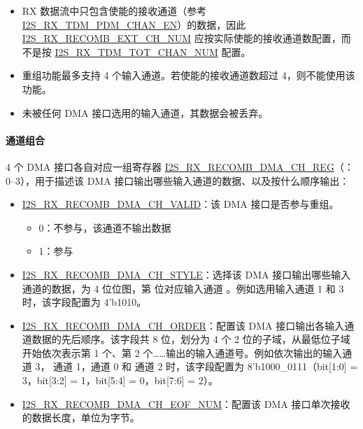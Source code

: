 \documentclass[main\_\_CN.tex]{subfiles}
\begin{document}
\begin{tiplisting}
\vspace{-2em}
\begin{itemize}
    \item RX 数据流中只包含使能的接收通道（参考 \hyperref[fielddesc:I2SRXTDMPDMCHAN0EN]{I2S\_RX\_TDM\_PDM\_CHAN\_EN}）的数据，因此\\ \hyperref[fielddesc:I2SRXRECOMBEXTCHNUM]{I2S\_RX\_RECOMB\_EXT\_CH\_NUM} 应按实际使能的接收通道数配置，而不是按 \hyperref[fielddesc:I2SRXTDMTOTCHANNUM]{I2S\_RX\_TDM\_TOT\_CHAN\_NUM} 配置。
    \item 重组功能最多支持 4 个输入通道。若使能的接收通道数超过 4，则不能使用该功能。
    \item 未被任何 DMA 接口选用的输入通道，其数据会被丢弃。
\end{itemize}
\end{tiplisting}

\paragraph{通道组合}

4 个 DMA 接口各自对应一组寄存器 \hyperref[regdesc:I2SRXRECOMBDMACH0REG]{I2S\_RX\_RECOMB\_DMA\_CH\_REG}（：0--3），用于描述该 DMA 接口输出哪些输入通道的数据、以及按什么顺序输出：

\begin{itemize}
    \item \hyperref[fielddesc:I2SRXRECOMBDMACH0VALID]{I2S\_RX\_RECOMB\_DMA\_CH\_VALID}：该 DMA 接口是否参与重组。
    \begin{itemize}
        \item 0：不参与，该通道不输出数据
        \item 1：参与
    \end{itemize}
    \item \hyperref[fielddesc:I2SRXRECOMBDMACH0STYLE]{I2S\_RX\_RECOMB\_DMA\_CH\_STYLE}：选择该 DMA 接口输出哪些输入通道的数据，为 4 位位图，第  位对应输入通道 。例如选用输入通道 1 和 3 时，该字段配置为 4'b1010。
    \item \hyperref[fielddesc:I2SRXRECOMBDMACH0ORDER]{I2S\_RX\_RECOMB\_DMA\_CH\_ORDER}：配置该 DMA 接口输出各输入通道数据的先后顺序。该字段共 8 位，划分为 4 个 2 位的子域，从最低位子域开始依次表示第 1 个、第 2 个……输出的输入通道号。例如依次输出的输入通道 3， 通道 1，通道 0 和 通道 2 时，该字段配置为 8'b1000\_0111（bit[1:0] = 3，bit[3:2] = 1，bit[5:4] = 0，bit[7:6] = 2）。
    \item \hyperref[fielddesc:I2SRXRECOMBDMACH0EOFNUM]{I2S\_RX\_RECOMB\_DMA\_CH\_EOF\_NUM}：配置该 DMA 接口单次接收的数据长度，单位为字节。
\end{itemize}
\end{document}
